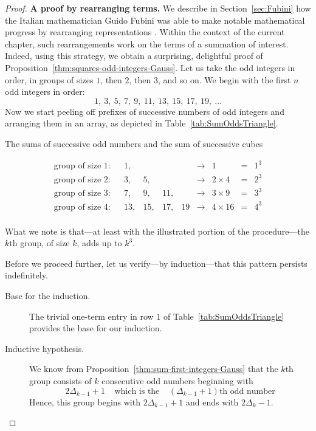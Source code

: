 \medskip

\begin{proof}
{\bf A proof by rearranging terms.}
%
We describe in Section~\ref{sec:Fubini} how the Italian mathematician
Guido Fubini
%
was able to make notable mathematical progress by rearranging
representations \cite{Fubini}.  Within the context of the current
chapter, such rearrangements work on the terms of a summation of
interest.  Indeed, using this strategy, we obtain a surprising,
delightful proof of Proposition~\ref{thm:squares-odd-integers-Gauss}.
Let us take the odd integers in order, in groups of sizes $1$, then
$2$, then $3$, and so on.  We begin with the first $n$ odd integers in
order:
\[ 1, \ 3, \ 5, \ 7, \ 9, \ 11, \ 13, \ 15, \ 17, \ 19, \ \ldots \]
Now we start peeling off prefixes of successive numbers of odd
integers and arranging them in an array, as depicted in
Table~\ref{tab:SumOddsTriangle}.
\begin{table}[ht]
\label{tab:SumOddsTriangle}
\caption{The sums of successive odd numbers and the sum of
  successive cubes}
\[
\begin{array}{llrrrrclcc}
\mbox{group of size 1:} & &
1,  &    &     &     &  \rightarrow & 1           & = & 1^3 \\
\mbox{group of size 2:} & &
3,  &  5, &     &    &  \rightarrow & 2 \times 4  & = & 2^3 \\
\mbox{group of size 3:} & &
7,  &  9, & 11, &    &  \rightarrow & 3 \times 9  & = & 3^3 \\
\mbox{group of size 4:} & &
13, & 15, & 17, & 19 &  \rightarrow & 4 \times 16 & = & 4^3 \\
\end{array}
\]
\end{table}
What we note is that---at least with the illustrated portion of the
procedure---the $k$th group, of size $k$, adds up to $k^3$.

Before we proceed further, let us verify---by induction---that this
pattern persists indefinitely.
\begin{description}
\item[{\sf Base for the induction.}]
The trivial one-term entry in row $1$ of Table~\ref{tab:SumOddsTriangle}
provides the base for our induction.

\item[{\sf Inductive hypothesis}.]
We know from Proposition~\ref{thm:sum-first-integers-Gauss} that the
$k$th group consists of $k$ consecutive odd numbers beginning with
\[ 2 \Delta_{k-1} +1 \ \ \ \ \
\mbox{which is the} \ \ \ \ \
\left( \Delta_{k-1} +1 \right)\mbox{th odd number}
\]
Hence, this group begins with $2 \Delta_{k-1} +1$ and ends with
$2\Delta_k -1$.


\end{description}
\end{proof}
